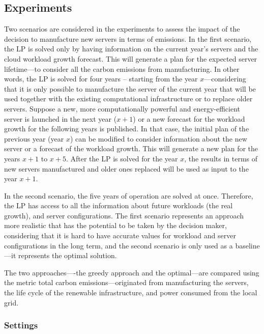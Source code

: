 \subsection{Experiments}


Two scenarios are considered in the experiments to assess the impact of the decision to manufacture new servers in terms of  emissions. In the first scenario, the LP is solved only by having information on the current year's servers and the cloud workload growth forecast. This will generate a plan for the expected server lifetime---to consider all the carbon emissions from manufacturing. In other words, the LP is solved for four years -- starting from the year $x$---considering that it is only possible to manufacture the server of the current year that will be used together with the existing computational infrastructure or to replace older servers. Suppose a new, more computationally powerful and energy-efficient server is launched in the next year ($x+1$) or a new forecast for the workload growth for the following years is published. In that case, the initial plan of the previous year (year $x$) can be modified to consider information about the new server or a forecast of the workload growth. This will generate a new plan for the years $x+1$ to $x+5$. After the LP is solved for the year $x$, the results in terms of new servers manufactured and older ones replaced will be used as input to the year $x +1$. 

In the second scenario, the five years of operation are solved at once. Therefore, the LP has access to all the information about future workloads (the real growth), and server configurations. The first scenario represents an approach more realistic that has the potential to be taken by the decision maker, considering that it is hard to have accurate values for workload and server configurations in the long term, and the second scenario is only used as a baseline---it represents the optimal solution.

The two approaches----the greedy approach and the optimal---are compared using the metric total carbon emissions---originated from manufacturing the servers, the life cycle of the renewable infrastructure, and power consumed from the local grid.

\subsubsection{Settings}

